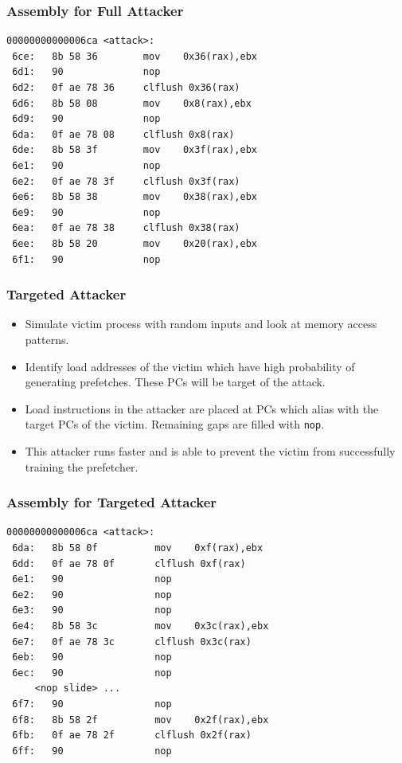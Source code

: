 \documentclass[10pt,usenames,dvipsnames]{beamer}
\begin{document}
\begin{frame}[fragile]
\frametitle{Assembly for Full Attacker}
\begin{lstlisting}[caption={Assembly showing load misses at different PCs},
label={lst:full_attack}]
00000000000006ca <attack>:
 6ce:   8b 58 36        mov    0x36(rax),ebx
 6d1:   90              nop
 6d2:   0f ae 78 36     clflush 0x36(rax)
 6d6:   8b 58 08        mov    0x8(rax),ebx
 6d9:   90              nop
 6da:   0f ae 78 08     clflush 0x8(rax)
 6de:   8b 58 3f        mov    0x3f(rax),ebx
 6e1:   90              nop
 6e2:   0f ae 78 3f     clflush 0x3f(rax)
 6e6:   8b 58 38        mov    0x38(rax),ebx
 6e9:   90              nop
 6ea:   0f ae 78 38     clflush 0x38(rax)
 6ee:   8b 58 20        mov    0x20(rax),ebx
 6f1:   90              nop
\end{lstlisting}
\end{frame}


\begin{frame}
\frametitle{Targeted Attacker}
\begin{itemize}
    \item Simulate victim process with random inputs and look at memory access patterns.
    \item Identify load addresses of the victim which have high probability
        of generating prefetches. These PCs will be target of the attack.
    \item Load instructions in the attacker are placed at PCs which alias with the target
        PCs of the victim. Remaining gaps are filled with \texttt{nop}.
    \item This attacker runs faster and is able to prevent the victim from successfully
        training the prefetcher.
\end{itemize}
\end{frame}

\begin{frame}[fragile]
\frametitle{Assembly for Targeted Attacker}
\begin{lstlisting}[caption={Attacker targeting specific PC addresses},
label={lst:targeted_attack}]
00000000000006ca <attack>:
 6da:   8b 58 0f          mov    0xf(rax),ebx
 6dd:   0f ae 78 0f       clflush 0xf(rax)
 6e1:   90                nop
 6e2:   90                nop
 6e3:   90                nop
 6e4:   8b 58 3c          mov    0x3c(rax),ebx
 6e7:   0f ae 78 3c       clflush 0x3c(rax)
 6eb:   90                nop
 6ec:   90                nop
     <nop slide> ...
 6f7:   90                nop
 6f8:   8b 58 2f          mov    0x2f(rax),ebx
 6fb:   0f ae 78 2f       clflush 0x2f(rax)
 6ff:   90                nop
\end{lstlisting}
\end{frame}
\end{document}
